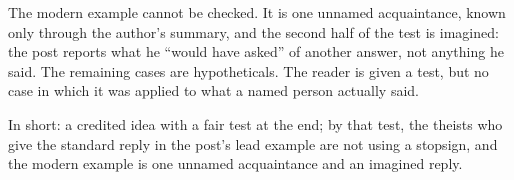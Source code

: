 \begin{afterword}
The modern example cannot be checked. It is one unnamed acquaintance, known only through the author's summary, and the second half of the test is imagined: the post reports what he ``would have asked'' of another answer, not anything he said. The remaining cases are hypotheticals. The reader is given a test, but no case in which it was applied to what a named person actually said.

In short: a credited idea with a fair test at the end; by that test, the theists who give the standard reply in the post's lead example are not using a stopsign, and the modern example is one unnamed acquaintance and an imagined reply.
\end{afterword}

